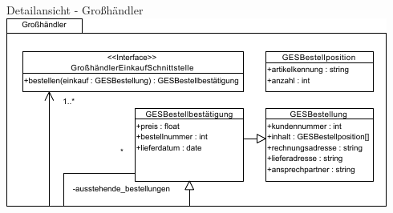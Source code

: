 \documentclass{beamer}
\begin{document}
\begin{frame}{Detailansicht - Großhändler}
\includegraphics[width=\textwidth]{PDF/GH_Paket.pdf}
\end{frame}
	\begin{frame}[title=Hauptgebaeude_Nacht.jpg]
		\maketitle
		\date{26. Mai 2018}
	\end{frame}
\end{document}
